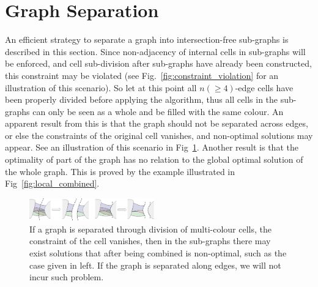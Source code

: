 \documentclass[conference]{IEEEtran}
\begin{document}
\section{Graph Separation}
\label{section_graph_separation}
 An efficient strategy to separate a graph into intersection-free sub-graphs is described in this section. 
Since non-adjacency of internal cells in sub-graphs will be enforced, and cell sub-division after sub-graphs have already been constructed, 
this constraint may be violated (see Fig.~\ref{fig:constraint_violation} for an illustration of this scenario).
So let at this point all $n(\geq 4)$-edge cells have been properly divided before applying the algorithm, 
thus all cells in the sub-graphs can only be seen as a whole and be filled with the same colour. 
An apparent result from this is that the graph should not be separated across edges, or else the constraints of the original cell vanishes, and non-optimal solutions may appear. See an illustration of this scenario in Fig~\ref{fig:separation_at_edges}. 
Another result is that the optimality of part of the graph has no relation to the global optimal solution of the whole graph. 
This is proved by the example illustrated in Fig~\ref{fig:local_combined}. 

\begin{figure}[t]
\centering
\includegraphics[width=0.48\textwidth]{figures/separation_at_edges_2}
\caption{If a graph is separated through division of multi-colour cells, the constraint of the cell vanishes, then in the sub-graphs there may exist solutions that after being combined is non-optimal, such as the case given in left. If the graph is separated along edges, we will not incur such problem. }\label{fig:separation_at_edges}
\end{figure}
\end{document}
